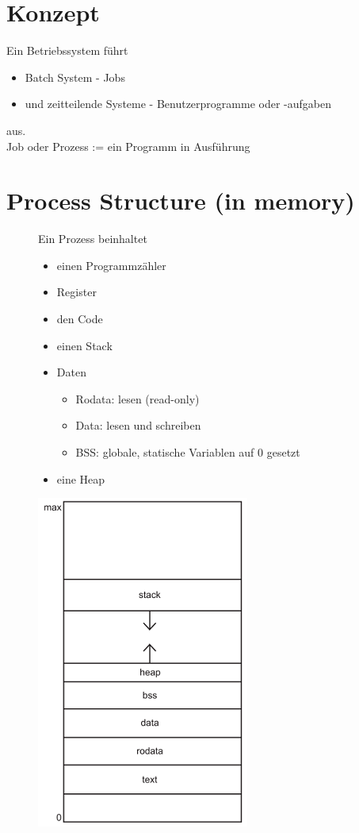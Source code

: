 \documentclass[a4paper]{scrreprt}
\begin{document}
\section{Konzept}
	Ein Betriebssystem führt
	\begin{itemize}
		\item Batch System - Jobs
		\item und zeitteilende Systeme - Benutzerprogramme oder -aufgaben
	\end{itemize} 
	aus.\\
	Job oder Prozess := ein Programm in Ausführung
\section{Process Structure (in memory)}
	\begin{figure}[htbp]
		\begin{minipage}[t]{10cm}
			\vspace{0pt}
			Ein Prozess beinhaltet
			\begin{itemize}
				\item einen Programmzähler
				\item Register
				\item den Code
				\item einen Stack
				\item Daten
				\begin{itemize}
					\item Rodata: lesen (read-only)
					\item Data: lesen und schreiben
					\item BSS: globale, statische Variablen auf 0 gesetzt
				\end{itemize}
				\item eine Heap
			\end{itemize}
		\end{minipage}
		\hfill
		\begin{minipage}[t]{4cm}
			\vspace{0pt}
			\centering
			\includegraphics[scale = 0.3]{graphics/memory.png}\\
		\end{minipage}
	\end{figure}
\end{document}
